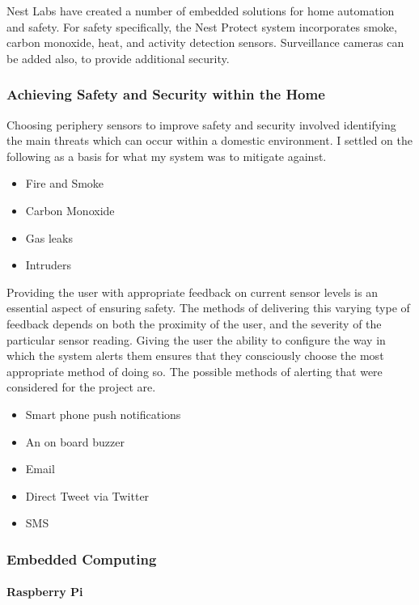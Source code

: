 \documentclass{article}
\begin{document}
Nest Labs have created a number of embedded solutions for home automation and safety. For safety specifically, the Nest Protect system incorporates smoke, carbon monoxide, heat, and activity detection sensors. Surveillance cameras can be added also, to provide additional security. 

\subsubsection{Achieving Safety and Security within the Home}
Choosing periphery sensors to improve safety and security involved identifying the main threats which can occur within a domestic environment. I settled on the following as a basis for what my system was to mitigate against.

\begin{itemize}
  \item Fire and Smoke
  \item Carbon Monoxide
  \item Gas leaks
  \item Intruders 
\end{itemize}

Providing the user with appropriate feedback on current sensor levels is an essential aspect of ensuring safety. The methods of delivering this varying type of feedback depends on both the proximity of the user, and the severity of the particular sensor reading. Giving the user the ability to configure the way in which the system alerts them ensures that they consciously choose the most appropriate method of doing so. The possible methods of alerting that were considered for the project are.

\begin{itemize}
  \item Smart phone push notifications
  \item An on board buzzer
  \item Email	
  \item Direct Tweet via Twitter
  \item SMS 
\end{itemize}

\subsubsection{Embedded Computing}
\paragraph{Raspberry Pi}
\end{document}

